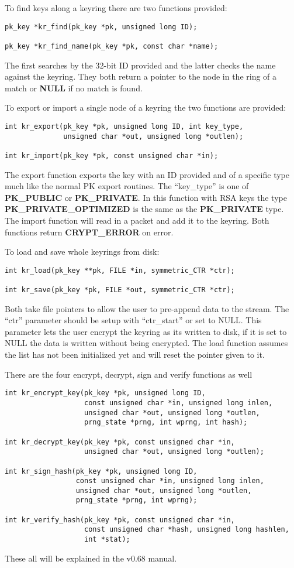 \documentclass{book}
\begin{document}
To find keys along a keyring there are two functions provided:
\begin{verbatim}
pk_key *kr_find(pk_key *pk, unsigned long ID);

pk_key *kr_find_name(pk_key *pk, const char *name);
\end{verbatim}
The first searches by the 32-bit ID provided and the latter checks the name against the keyring.  They both return a pointer
to the node in the ring of a match or {\bf NULL} if no match is found.

To export or import a single node of a keyring the two functions are provided:
\begin{verbatim}
int kr_export(pk_key *pk, unsigned long ID, int key_type, 
              unsigned char *out, unsigned long *outlen);

int kr_import(pk_key *pk, const unsigned char *in);
\end{verbatim}
The export function exports the key with an ID provided and of a specific type much like the normal PK export routines.  The
``key\_type'' is one of {\bf PK\_PUBLIC} or {\bf PK\_PRIVATE}.  In this function with RSA keys the type 
{\bf PK\_PRIVATE\_OPTIMIZED} is the same as the {\bf PK\_PRIVATE} type.  The import function will read in a packet and 
add it to the keyring.  Both functions return {\bf CRYPT\_ERROR} on error.

To load and save whole keyrings from disk:
\begin{verbatim}
int kr_load(pk_key **pk, FILE *in, symmetric_CTR *ctr);

int kr_save(pk_key *pk, FILE *out, symmetric_CTR *ctr);
\end{verbatim}
Both take file pointers to allow the user to pre-append data to the stream.  The ``ctr'' parameter should be setup with 
``ctr\_start'' or set to NULL.  This parameter lets the user encrypt the keyring as its written to disk, if it is set
to NULL the data is written without being encrypted.  The load function assumes the list has not been initialized yet 
and will reset the pointer given to it.

There are the four encrypt, decrypt, sign and verify functions as well
\begin{verbatim}
int kr_encrypt_key(pk_key *pk, unsigned long ID, 
                   const unsigned char *in, unsigned long inlen,
                   unsigned char *out, unsigned long *outlen,
                   prng_state *prng, int wprng, int hash);

int kr_decrypt_key(pk_key *pk, const unsigned char *in,
                   unsigned char *out, unsigned long *outlen);

int kr_sign_hash(pk_key *pk, unsigned long ID, 
                 const unsigned char *in, unsigned long inlen,
                 unsigned char *out, unsigned long *outlen,
                 prng_state *prng, int wprng);

int kr_verify_hash(pk_key *pk, const unsigned char *in, 
                   const unsigned char *hash, unsigned long hashlen,
                   int *stat);
\end{verbatim}
These all will be explained in the v0.68 manual.  
\end{document}
